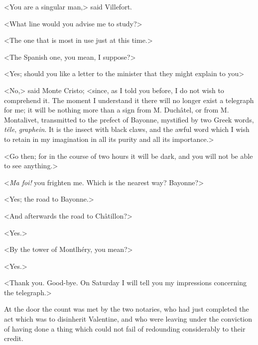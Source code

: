  <You are a singular man,> said Villefort. 

 <What line would you advise me to study?> 

 <The one that is most in use just at this time.> 

 <The Spanish one, you mean, I suppose?> 

 <Yes; should you like a letter to the minister that they might explain to you\longdash> 

 <No,> said Monte Cristo; <since, as I told you before, I do not wish to comprehend it. The moment I understand it there will no longer exist a telegraph for me; it will be nothing more than a sign from M. Duchâtel, or from M. Montalivet, transmitted to the prefect of Bayonne, mystified by two Greek words, \textit{têle}, \textit{graphein}. It is the insect with black claws, and the awful word which I wish to retain in my imagination in all its purity and all its importance.> 

 <Go then; for in the course of two hours it will be dark, and you will not be able to see anything.> 

 <\textit{Ma foi!} you frighten me. Which is the nearest way? Bayonne?> 

 <Yes; the road to Bayonne.> 

 <And afterwards the road to Châtillon?> 

 <Yes.> 

 <By the tower of Montlhéry, you mean?> 

 <Yes.> 

 <Thank you. Good-bye. On Saturday I will tell you my impressions concerning the telegraph.> 

 At the door the count was met by the two notaries, who had just completed the act which was to disinherit Valentine, and who were leaving under the conviction of having done a thing which could not fail of redounding considerably to their credit. 